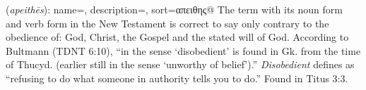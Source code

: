 \item[Disobedient,]

(\textit{apeithēs}):
{
    name=,
    description={},
    sort=απειθης@
}
The term with its noun form  and verb form  in the New Testament is correct to say only contrary to the obedience of: God, Christ, the Gospel and the stated will of God. According to Bultmann (TDNT 6:10), ``in the sense `disobedient' is found in Gk. from the time of Thucyd. (earlier still in the sense `unworthy of belief').''  \emph{Disobedient} defines as ``refusing to do what someone in authority tells you to do.''
Found in Titus 3:3.
